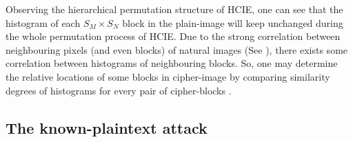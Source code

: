 \documentclass[final,3p,times,twocolumn]{elsarticle}
\begin{document}
Observing the hierarchical permutation structure of HCIE, one can see that
the histogram of each $S_M\times S_N$ block in the plain-image will keep unchanged
during the whole permutation process of HCIE. Due to the strong correlation between neighbouring pixels
(and even blocks) of natural images (See \cite[Fig.~5]{Li:RCES:JSS2008}), there exists some correlation between histograms of neighbouring blocks.
So, one may determine the relative locations of some blocks in cipher-image by comparing similarity degrees of
histograms for every pair of cipher-blocks \cite{HSLI:Banknote:TM14,Ling:histogramcomparison:PAMI07}.

\subsection{The known-plaintext attack}
\end{document}
